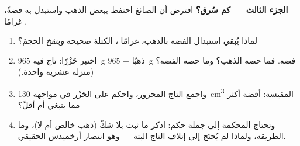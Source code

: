 \begin{problem}
\medskip\noindent\textbf{الجزء الثالث --- كم سُرق؟}
افترض أن الصائغ احتفظ ببعض الذهب واستبدل به فضةً، غرامًا
.
\begin{enumerate}[resume]
  \item لماذا يُبقي استبدال الفضة بالذهب، غرامًا ، الكتلةَ
        صحيحة \emph{وينفخ} الحجمَ؟
  \item اختبر حَزْرًا: تاج فيه \qty{965}{g} ذهبًا $+$
        \qty{965}{g} فضة. فما  حصة الذهب؟ وما  حصة
        الفضة؟ (منزلة عشرية واحدة.)
  \item واجمع  التاج المحزور، واحكم على الحَزْر في مواجهة
        \qty{130}{cm^3} المقيسة: أفضة أكثر مما ينبغي أم أقلّ؟
  \item وتحتاج المحكمة إلى جملة حكم: اذكر ما ثبت بلا شكّ (ذهب
        خالص أم لا)، وما الطريقة، ولماذا لم يُحتَج إلى إتلاف
        التاج البتة --- وهو انتصار أرخميدس الحقيقي.
\end{enumerate}
\end{problem}
